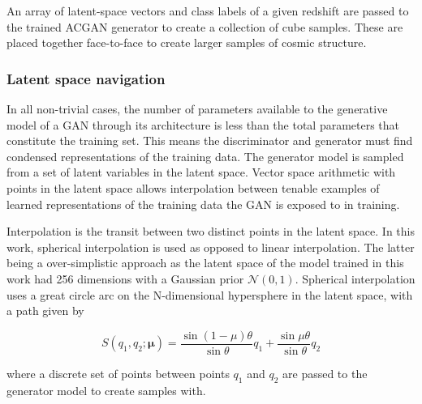\documentclass[twocolumn]{article}
\numberwithin{equation}{section}
\begin{document}

An array of latent-space vectors and class labels of a given redshift are passed to the trained ACGAN generator to create a
collection of cube samples. These are placed together face-to-face to create larger samples of cosmic structure. 


\subsubsection{Latent space navigation}
In all non-trivial cases, the number of parameters available to the generative model of a GAN through its architecture is less 
than the total parameters that constitute the training set. This means the discriminator and generator must find condensed 
representations of the training data. The generator model is sampled from a set of latent variables in the latent space. 
Vector space arithmetic with points in the latent space allows interpolation between tenable examples of learned 
representations of the training data the GAN is exposed to in training. 

Interpolation is the transit between two distinct points in the latent space. In this work, spherical interpolation is used
as opposed to linear interpolation. The latter being a over-simplistic approach as the latent space of the model trained in 
this work had 256 dimensions with a Gaussian prior $\mathcal{N}(0,1)$. Spherical interpolation uses a great circle arc on the 
N-dimensional hypersphere in the latent space, with a path given by %

\begin{equation}
    S(q_1, q_2; \mathbf{\mu}) = \frac{\sin (1 - \mu)\theta}{\sin \theta}q_1 + \frac{\sin \mu\theta}{\sin \theta}q_2
\end{equation}

where a discrete set of points between points $q_1$ and $q_2$ are passed to the generator model to create samples with. 


\end{document}
